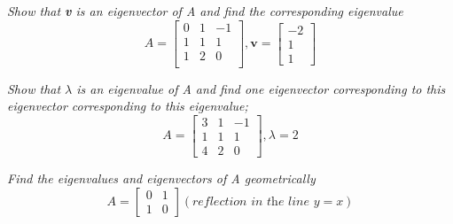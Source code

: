 \documentclass[12pt,letterpaper]{hmcpset}
\begin{document}


\begin{problem}[4.1.6]

\textit{Show that \textbf{v} is an eigenvector of A and find the corresponding eigenvalue }
$$
A=\begin{bmatrix}
0&1&-1\\
1&1&1\\
1&2&0\\
\end{bmatrix}
, \textbf{v}= \begin{bmatrix}
-2\\1\\1
\end{bmatrix}
$$
\end{problem}
\begin{solution}
\end{solution}

\newpage




\begin{problem}[4.1.12]
\textit{Show that $\lambda$ is an eigenvalue of A and find one eigenvector corresponding to this eigenvector corresponding to this eigenvalue;}
$$
A=\begin{bmatrix}
3&1&-1\\
1&1&1\\
4&2&0
\end{bmatrix}
, \lambda=2
$$
\end{problem}

\begin{solution}
\end{solution}

\newpage



\begin{problem}[4.1.14]
\textit{Find the eigenvalues and eigenvectors of A geometrically} 
$$ A=\begin{bmatrix}
0&1\\1&0
\end{bmatrix} (\textit{reflection in the line } y=x)
$$
\end{problem}

\begin{solution}
\end{solution}

\newpage
\end{document}

